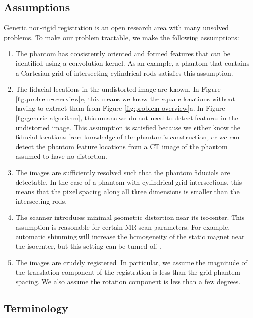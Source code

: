 \documentclass[12pt]{article}
\begin{document}
\subsection{Assumptions}

Generic non-rigid registration is an open research area with many unsolved problems. To make our problem tractable, we make the following assumptions: 

\begin{enumerate}
\item The phantom has consistently oriented and formed features that can be identified using a convolution kernel.  As an example, a phantom that contains a Cartesian grid of intersecting cylindrical rods satisfies this assumption.

\item The fiducial locations in the undistorted image are known.  In Figure \ref{fig:problem-overview}e, this means we know the square locations without having to extract them from Figure \ref{fig:problem-overview}a.  In Figure \ref{fig:generic-algorithm}, this means we do not need to detect features in the undistorted image. This assumption is satisfied because we either know the fiducial locations from knowledge of the phantom's construction, or we can detect the phantom feature locations from a CT image of the phantom assumed to have no distortion.

\item The images are sufficiently resolved such that the phantom fiducials are detectable.  In the case of a phantom with cylindrical grid intersections, this means that the pixel spacing along all three dimensions is smaller than the intersecting rods.

\item The scanner introduces minimal geometric distortion near its isocenter.  This assumption is reasonable for certain MR scan parameters.  For example, automatic shimming will increase the homogeneity of the static magnet near the isocenter, but this setting can be turned off \cite{baldwin2007}.

\item The images are crudely registered.  In particular, we assume the magnitude of the translation component of the registration is less than the grid phantom spacing.  We also assume the rotation component is less than a few degrees.
\end{enumerate}

\subsection{Terminology}
\end{document}
